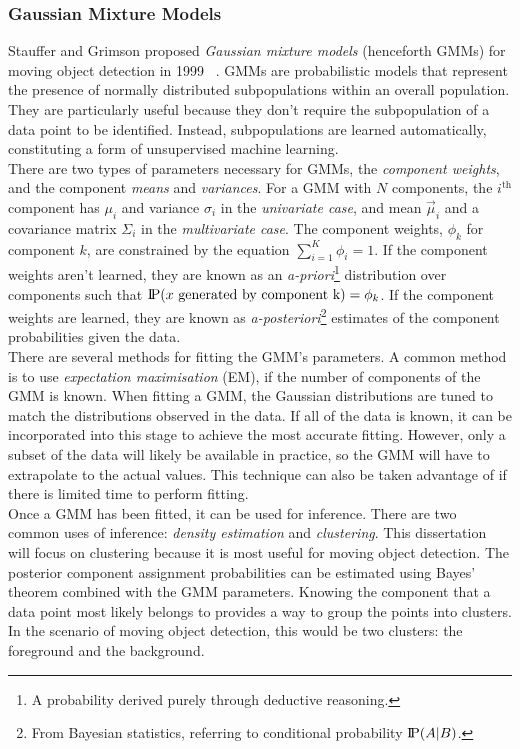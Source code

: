 \subsubsection{Gaussian Mixture Models}
\setlength{\leftskip}{0.5cm}
\indent \indent
Stauffer and Grimson proposed \textit{Gaussian mixture models} (henceforth GMMs) for moving object detection in 1999 ~\cite{Stauffer}. GMMs are probabilistic models that represent the presence of normally distributed subpopulations within an overall population. They are particularly useful because they don't require the subpopulation of a data point to be identified. Instead, subpopulations are learned automatically, constituting a form of unsupervised machine learning.
\smallskip \\ \indent
There are two types of parameters necessary for GMMs, the \textit{component weights}, and the component \textit{means} and \textit{variances}. For a GMM with $N$ components, the $i^\text{th}$ component has $\mu_i$ and variance $\sigma_i$ in the \textit{univariate case}, and mean $\vec{\mu}_i$ and a covariance matrix $\Sigma_i$ in the \textit{multivariate case}. The component weights, $\phi_k$ for component $k$, are constrained by the equation $\sum^K_{i=1} \phi_i = 1$. If the component weights aren't learned, they are known as an \textit{a-priori}\footnote{A probability derived purely through deductive reasoning.} distribution over components such that $\text{I\kern-0.15em P}(x \text{ generated by component k}) = \phi_k$. If the component weights are learned, they are known as \textit{a-posteriori}\footnote{From Bayesian statistics, referring to conditional probability $\text{I\kern-0.15em P}(A | B)$.} estimates of the component probabilities given the data.
\smallskip \\ \indent
There are several methods for fitting the GMM's parameters. A common method is to use \textit{expectation maximisation} (EM), if the number of components of the GMM is known. When fitting a GMM, the Gaussian distributions are tuned to match the distributions observed in the data. If all of the data is known, it can be incorporated into this stage to achieve the most accurate fitting. However, only a subset of the data will likely be available in practice, so the GMM will have to extrapolate to the actual values. This technique can also be taken advantage of if there is limited time to perform fitting.
\smallskip \\ \indent
Once a GMM has been fitted, it can be used for inference. There are two common uses of inference: \textit{density estimation} and \textit{clustering}. This dissertation will focus on clustering because it is most useful for moving object detection. The posterior component assignment probabilities can be estimated using Bayes' theorem combined with the GMM parameters. Knowing the component that a data point most likely belongs to provides a way to group the points into clusters. In the scenario of moving object detection, this would be two clusters: the foreground and the background.

